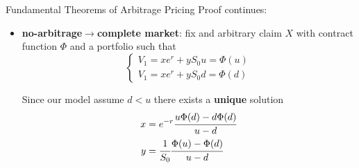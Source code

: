 \documentclass{beamer}
\begin{document}
\begin{frame}{Fundamental Theorems of Arbitrage Pricing}
	Proof continues:
	\begin{itemize}
		\item \textbf{no-arbitrage$\rightarrow$complete market}: fix and arbitrary claim $X$ with contract function $\Phi$ and a portfolio such that
		\begin{equation*}
			\begin{cases}
				V_1 = x e^r + yS_0u = \Phi(u)\\
				V_1 = x e^r + yS_0d = \Phi(d)
			\end{cases}
		\end{equation*}
		
		Since our model assume $d<u$ there exists a \textbf{unique} solution
		\begin{equation}
			\begin{aligned}
				x &= e^{-r}\cfrac{u\Phi(d)-d\Phi(d)}{u-d} \\
				y &= \cfrac{1}{S_0}\cfrac{\Phi(u)-\Phi(d)}{u-d}
			\end{aligned}
		\label{eq:replica_portfolio_value}
		\end{equation}
	\end{itemize}
\end{frame}
\end{document}
